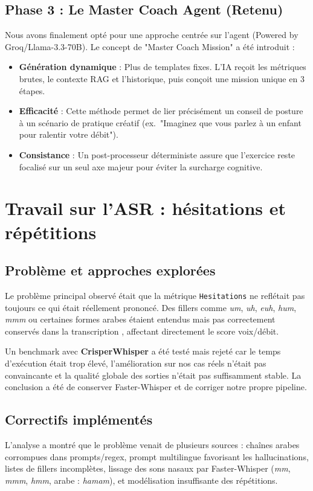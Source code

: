 ﻿\documentclass[12pt,a4paper]{article}
\begin{document}
\subsection{Phase 3 : Le Master Coach Agent (Retenu)}
Nous avons finalement opté pour une approche centrée sur l'agent (Powered by Groq/Llama-3.3-70B). Le concept de "Master Coach Mission" a été introduit :
\begin{itemize}
    \item \textbf{Génération dynamique} : Plus de templates fixes. L'IA reçoit les métriques brutes, le contexte RAG et l'historique, puis conçoit une mission unique en 3 étapes.
    \item \textbf{Efficacité} : Cette méthode permet de lier précisément un conseil de posture à un scénario de pratique créatif (ex.\ "Imaginez que vous parlez à un enfant pour ralentir votre débit").
    \item \textbf{Consistance} : Un post-processeur déterministe assure que l'exercice reste focalisé sur un seul axe majeur pour éviter la surcharge cognitive.
\end{itemize}

\section{Travail sur l'ASR : hésitations et répétitions}
\label{sec:asr-hesitations}

\subsection{Problème et approches explorées}
Le problème principal observé était que la métrique \texttt{Hesitations} ne reflétait pas toujours ce qui était réellement prononcé. Des fillers comme \textit{um}, \textit{uh}, \textit{euh}, \textit{hum}, \textit{mmm} ou certaines formes arabes étaient entendus mais pas correctement conservés dans la transcription \cite{radford2022robust,ctranslate2}, affectant directement le score voix/débit.

Un benchmark avec \textbf{CrisperWhisper} \cite{zusag2024crisperwhisper,crisperwhisper_repo} a été testé mais rejeté car le temps d'exécution était trop élevé, l'amélioration sur nos cas réels n'était pas convaincante et la qualité globale des sorties n'était pas suffisamment stable. La conclusion a été de conserver Faster-Whisper et de corriger notre propre pipeline.

\subsection{Correctifs implémentés}
L'analyse a montré que le problème venait de plusieurs sources : chaînes arabes corrompues dans prompts/regex, prompt multilingue favorisant les hallucinations, listes de fillers incomplètes, lissage des sons nasaux par Faster-Whisper (\textit{mm}, \textit{mmm}, \textit{hmm}, arabe : \textit{hamam}), et modélisation insuffisante des répétitions.
\end{document}
